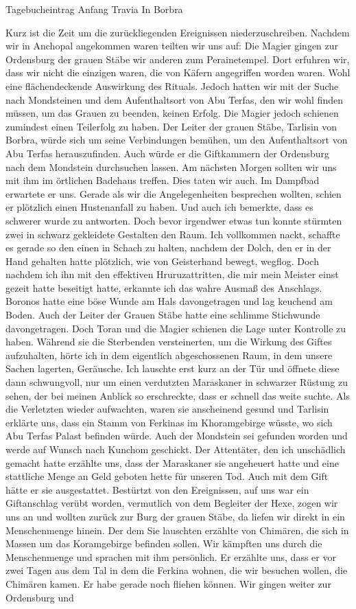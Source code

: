 Tagebucheintrag Anfang Travia In Borbra

Kurz ist die Zeit um die zurückliegenden Ereignissen niederzuschreiben. Nachdem wir in Anchopal angekommen waren teilten wir uns auf: Die Magier gingen zur Ordensburg der grauen Stäbe wir anderen zum Perainetempel. Dort erfuhren wir, dass wir nicht die einzigen waren, die von Käfern angegriffen worden waren. Wohl eine flächendeckende Auswirkung des Rituals. Jedoch hatten wir mit der Suche nach Mondsteinen und dem Aufenthaltsort von Abu Terfas, den wir wohl finden müssen, um das Grauen zu beenden, keinen Erfolg. Die Magier jedoch schienen zumindest einen Teilerfolg zu haben. Der Leiter der grauen Stäbe, Tarlisin von Borbra, würde sich um seine Verbindungen bemühen, um den Aufenthaltsort von Abu Terfas herauszufinden. Auch würde er die Giftkammern der Ordensburg nach dem Mondstein durchsuchen lassen. Am nächsten Morgen sollten wir uns mit ihm im örtlichen Badehaus treffen. Dies taten wir auch. Im Dampfbad erwartete er uns. Gerade als wir die Angelegenheiten besprechen wollten, schien er plötzlich einen Hustenanfall zu haben. Und auch ich bemerkte, dass es schwerer wurde zu antworten. Doch bevor irgendwer etwas tun konnte stürmten zwei in schwarz gekleidete Gestalten den Raum. Ich vollkommen nackt, schaffte es gerade so den einen in Schach zu halten, nachdem der Dolch, den er in der Hand gehalten hatte plötzlich, wie von Geisterhand bewegt, wegflog. Doch nachdem ich ihn mit den effektiven Hruruzattritten, die mir mein Meister einst gezeit hatte beseitigt hatte, erkannte ich das wahre Ausmaß des Anschlags. Boronos hatte eine böse Wunde am Hals davongetragen und lag keuchend am Boden. Auch der Leiter der Grauen Stäbe hatte eine schlimme Stichwunde davongetragen. Doch Toran und die Magier schienen die Lage unter Kontrolle zu haben. Während sie die Sterbenden versteinerten, um die Wirkung des Giftes aufzuhalten, hörte ich in dem eigentlich abgeschossenen Raum, in dem unsere Sachen lagerten, Geräusche. Ich lauschte erst kurz an der Tür und öffnete diese dann schwungvoll, nur um einen verdutzten Maraskaner in schwarzer Rüstung zu sehen, der bei meinen Anblick so erschreckte, dass er schnell das weite suchte. Als die Verletzten wieder aufwachten, waren sie anscheinend gesund und Tarlisin erklärte uns, dass ein Stamm von Ferkinas im Khoramgebirge wüsste, wo sich Abu Terfas Palast befinden würde. Auch der Mondstein sei gefunden worden und werde auf Wunsch nach Kunchom geschickt. Der Attentäter, den ich unschädlich gemacht hatte erzählte uns, dass der Maraskaner sie angeheuert hatte und eine stattliche Menge an Geld geboten hette für unseren Tod. Auch mit dem Gift hätte er sie ausgestattet. Bestürtzt von den Ereignissen, auf uns war ein Giftanschlag verübt worden, vermutlich von dem Begleiter der Hexe, zogen wir uns an und wollten zurück zur Burg der grauen Stäbe, da liefen wir direkt in ein Menschenmenge hinein. Der dem Sie lauschten erzählte von Chimären, die sich in Massen um das Koramgebirge befinden sollen. Wir kämpften uns durch die Menschenmenge und sprachen mit ihm persönlich. Er erzählte uns, dass er vor zwei Tagen aus dem Tal in dem die Ferkina wohnen, die wir besuchen wollen, die Chimären kamen. Er habe gerade noch fliehen können. Wir gingen weiter zur Ordensburg und 